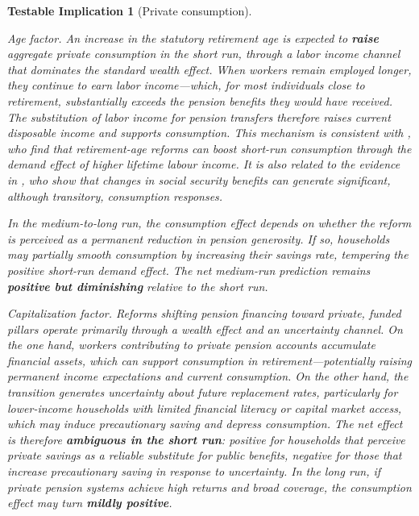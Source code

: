 \documentclass[11pt,english,a4paper, twoside, authoryear]{article}
\newtheorem{testable}{Testable Implication}}
\begin{document}
\begin{testable}[Private consumption]\label{test:conso}


\textit{Age factor.} An increase in the statutory retirement age is expected to \textbf{raise} aggregate private consumption in the short run, through a labor income channel that dominates the standard wealth effect. When workers remain employed longer, they continue to earn labor income---which, for most individuals close to retirement, substantially exceeds the pension benefits they would have received. The substitution of labor income for pension transfers therefore raises current disposable income and supports consumption. This mechanism is consistent with \citet{KaramMuirPereiraTuladhar2010}, who find that retirement-age reforms can boost short-run consumption through the demand effect of higher lifetime labour income. It is also related to the evidence in \citet{RomerRomer2016}, who show that changes in social security benefits can generate significant, although transitory, consumption responses.

In the medium-to-long run, the consumption effect depends on whether the reform is perceived as a permanent reduction in pension generosity. If so, households may partially smooth consumption by increasing their savings rate, tempering the positive short-run demand effect. The net medium-run prediction remains \textbf{positive but diminishing} relative to the short run.

\textit{Capitalization factor.} Reforms shifting pension financing toward private, funded pillars operate primarily through a wealth effect and an uncertainty channel. On the one hand, workers contributing to private pension accounts accumulate financial assets, which can support consumption in retirement---potentially raising permanent income expectations and current consumption. On the other hand, the transition generates uncertainty about future replacement rates, particularly for lower-income households with limited financial literacy or capital market access, which may induce precautionary saving and depress consumption. The net effect is therefore \textbf{ambiguous in the short run}: positive for households that perceive private savings as a reliable substitute for public benefits, negative for those that increase precautionary saving in response to uncertainty. In the long run, if private pension systems achieve high returns and broad coverage, the consumption effect may turn \textbf{mildly positive}.


\end{testable}
\end{document}
